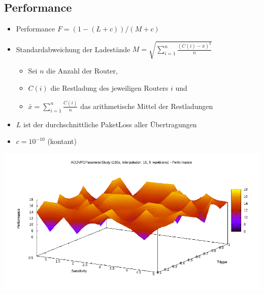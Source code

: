 \documentclass[11pt,handout,notes=only]{beamer}
\begin{document}

\subsection{Performance}

\begin{frame}{\insertsubsection}
\begin{itemize}
\item Performance $F = ( 1 - ( L + c ) ) / ( M + c )$\newline
\item Standardabweichung der Ladestände $M = \sqrt{\sum_{i=1}^{n} \frac{(C(i)-\bar{x})^2}{n}}$
\begin{itemize}
\item Sei $n$ die Anzahl der Router,
\item $C(i)$ die Restladung des jeweiligen Routers $i$ und 
\item $\bar{x} = \sum_{i=1}^{n} \frac{C(i)}{n}$ das arithmetische Mittel der Restladungen\newline
\end{itemize}
\item $L$ ist der durchschnittliche PaketLoss aller Übertragungen\newline
\item $c = 10^{-10}$ (kontant)
\end{itemize}
\end{frame}

\begin{frame}{\insertsubsection}
\includegraphics[scale=0.45]{aodvstudyperf}
\end{frame}
\end{document}
